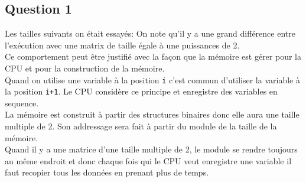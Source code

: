 \documentclass{article}
\begin{document}
\subsection*{Question 1}
\begin{resolution}
    Les tailles suivants on était essayés:
    On note qu'il y a une grand différence entre l'exécution avec une matrix de taille égale à une puissances de 2.\\

    Ce comportement peut être justifié avec la façon que la mémoire est gérer pour la CPU et pour la construction de la mémoire.\\

    Quand on utilise une variable à la position \texttt{i} c'est commun d'utiliser la variable à la position \texttt{i+1}. Le CPU considère ce principe et enregistre des variables en sequence.\\

    La mémoire est construit à partir des structures binaires donc elle aura une taille multiple de 2. Son addressage sera fait à partir du module de la taille de la mémoire.\\

    Quand il y a une matrice d'une taille multiple de 2, le module se rendre toujours au même endroit et donc chaque fois qui le CPU veut enregistre une variable il faut recopier tous les données en prenant plus de temps.
\end{resolution}
\end{document}
